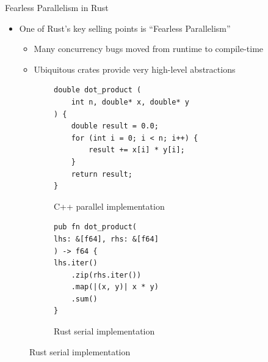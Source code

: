 \documentclass[10pt,aspectratio=169]{beamer}
\begin{document}
\begin{frame}[fragile]{Fearless Parallelism in Rust}
    \begin{itemize}
        \item One of Rust's key selling points is ``Fearless Parallelism''
        \begin{itemize}
            \item Many concurrency bugs moved from runtime to compile-time
            \item Ubiquitous crates provide very high-level abstractions
        \end{itemize}
    \end{itemize}    
    \vspace*{0.15cm}

    \begin{figure}
        \begin{subfigure}[c]{.55\textwidth}\centering
            \begin{verbatim}
double dot_product (
    int n, double* x, double* y
) {
    double result = 0.0;
    for (int i = 0; i < n; i++) {
        result += x[i] * y[i];
    }
    return result;
}
            \end{verbatim}
            \label{fig:cpp-ddot-serial}
            \caption{C++ parallel implementation}
        \end{subfigure}%
        \begin{subfigure}[c]{.45\textwidth}\centering
            \begin{verbatim}
pub fn dot_product(
lhs: &[f64], rhs: &[f64]
) -> f64 {
lhs.iter()
    .zip(rhs.iter())
    .map(|(x, y)| x * y)
    .sum()
}
            \end{verbatim}
            \label{fig:rust-ddot-serial}
            \vspace*{0.5cm}
            \caption{Rust serial implementation}
        \end{subfigure}
    \end{figure}
\end{frame}
\end{document}
